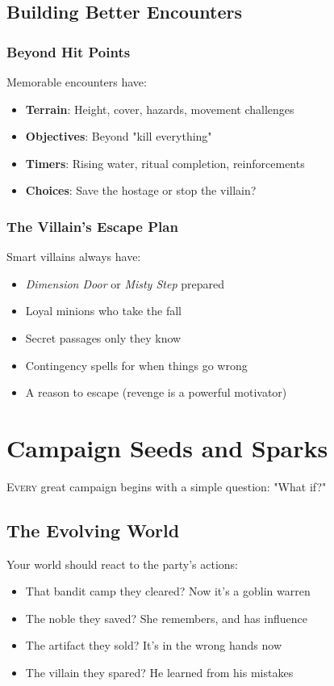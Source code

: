 \documentclass[11pt,letterpaper,openany]{book}
\newcommand{\spell}[1]{\textcolor{mysticblue}{\textit{#1}}}
\begin{document}
\section{Building Better Encounters}

\subsection{Beyond Hit Points}

Memorable encounters have:
\begin{itemize}
    \item \textbf{Terrain}: Height, cover, hazards, movement challenges
    \item \textbf{Objectives}: Beyond "kill everything"
    \item \textbf{Timers}: Rising water, ritual completion, reinforcements
    \item \textbf{Choices}: Save the hostage or stop the villain?
\end{itemize}

\subsection{The Villain's Escape Plan}

Smart villains always have:
\begin{itemize}
    \item \spell{Dimension Door} or \spell{Misty Step} prepared
    \item Loyal minions who take the fall
    \item Secret passages only they know
    \item Contingency spells for when things go wrong
    \item A reason to escape (revenge is a powerful motivator)
\end{itemize}

\chapter{Campaign Seeds and Sparks}

\lettrine[lines=3]{E}{very} great campaign begins with a simple question: "What if?"

\section{The Evolving World}

Your world should react to the party's actions:
\begin{itemize}
    \item That bandit camp they cleared? Now it's a goblin warren
    \item The noble they saved? She remembers, and has influence
    \item The artifact they sold? It's in the wrong hands now
    \item The villain they spared? He learned from his mistakes
\end{itemize}
\end{document}
